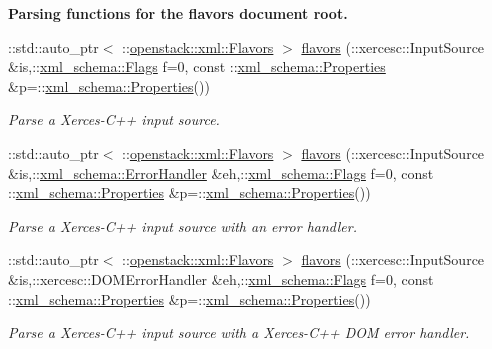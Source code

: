 \begin{Indent}{\bf Parsing functions for the flavors document root.}
\begin{DoxyCompactItemize}
::std::auto\_\-ptr$<$ ::\hyperlink{classopenstack_1_1xml_1_1Flavors}{openstack::xml::Flavors} $>$ \hyperlink{namespaceopenstack_1_1xml_ab07f680280e4e8d37f929822d0569599}{flavors} (::xercesc::InputSource \&is,::\hyperlink{namespacexml__schema_affb4c227cbd9aa7453dd1dc5a1401943}{xml\_\-schema::Flags} f=0, const ::\hyperlink{namespacexml__schema_ad27ce19a7ee1d3b1064092648898f64c}{xml\_\-schema::Properties} \&p=::\hyperlink{namespacexml__schema_ad27ce19a7ee1d3b1064092648898f64c}{xml\_\-schema::Properties}())
\begin{DoxyCompactList}\small\item\em Parse a Xerces-\/C++ input source. \item\end{DoxyCompactList}\item 
::std::auto\_\-ptr$<$ ::\hyperlink{classopenstack_1_1xml_1_1Flavors}{openstack::xml::Flavors} $>$ \hyperlink{namespaceopenstack_1_1xml_a2750dfb403126e6a4cb88e49e3e4d72c}{flavors} (::xercesc::InputSource \&is,::\hyperlink{namespacexml__schema_ab1c9361bfd3b404eaabf0c31eded79dc}{xml\_\-schema::ErrorHandler} \&eh,::\hyperlink{namespacexml__schema_affb4c227cbd9aa7453dd1dc5a1401943}{xml\_\-schema::Flags} f=0, const ::\hyperlink{namespacexml__schema_ad27ce19a7ee1d3b1064092648898f64c}{xml\_\-schema::Properties} \&p=::\hyperlink{namespacexml__schema_ad27ce19a7ee1d3b1064092648898f64c}{xml\_\-schema::Properties}())
\begin{DoxyCompactList}\small\item\em Parse a Xerces-\/C++ input source with an error handler. \item\end{DoxyCompactList}\item 
::std::auto\_\-ptr$<$ ::\hyperlink{classopenstack_1_1xml_1_1Flavors}{openstack::xml::Flavors} $>$ \hyperlink{namespaceopenstack_1_1xml_ad5ef6dbc90b483c31c9f15e289d08da9}{flavors} (::xercesc::InputSource \&is,::xercesc::DOMErrorHandler \&eh,::\hyperlink{namespacexml__schema_affb4c227cbd9aa7453dd1dc5a1401943}{xml\_\-schema::Flags} f=0, const ::\hyperlink{namespacexml__schema_ad27ce19a7ee1d3b1064092648898f64c}{xml\_\-schema::Properties} \&p=::\hyperlink{namespacexml__schema_ad27ce19a7ee1d3b1064092648898f64c}{xml\_\-schema::Properties}())
\begin{DoxyCompactList}\small\item\em Parse a Xerces-\/C++ input source with a Xerces-\/C++ DOM error handler. \item\end{DoxyCompactList}\item 

\end{DoxyCompactItemize}
\end{Indent}
